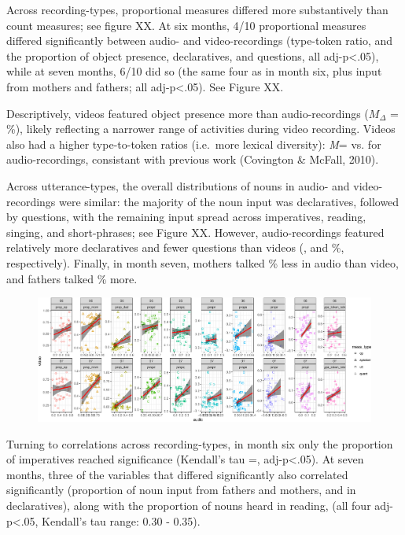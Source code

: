 \documentclass[floatsintext,man]{apa6}
\theoremstyle{definition}
\theoremstyle{definition}
\theoremstyle{definition}
\theoremstyle{remark}
\begin{document}
Across recording-types, proportional measures differed more
substantively than count measures; see figure XX. At six months, 4/10
proportional measures differed significantly between audio- and
video-recordings (type-token ratio, and the proportion of object
presence, declaratives, and questions, all adj-p\textless{}.05), while
at seven months, 6/10 did so (the same four as in month six, plus input
from mothers and fathers; all adj-p\textless{}.05). See Figure XX.

Descriptively, videos featured object presence more than
audio-recordings (\(M_{\Delta}\) = \%), likely reflecting a narrower
range of activities during video recording. Videos also had a higher
type-to-token ratios (i.e.~more lexical diversity): \emph{M}= vs. for
audio-recordings, consistant with previous work (Covington \& McFall,
2010).

Across utterance-types, the overall distributions of nouns in audio- and
video-recordings were similar: the majority of the noun input was
declaratives, followed by questions, with the remaining input spread
across imperatives, reading, singing, and short-phrases; see Figure XX.
However, audio-recordings featured relatively more declaratives and
fewer questions than videos (, and \%, respectively). Finally, in month
seven, mothers talked \% less in audio than video, and fathers talked \%
more.

\begin{figure}[htbp]
\centering
\includegraphics{sixseven_papaja_files/figure-latex/gr_derived_props_av-1.pdf}
\caption{}
\end{figure}

Turning to correlations across recording-types, in month six only the
proportion of imperatives reached significance (Kendall's tau =,
adj-p\textless{}.05). At seven months, three of the variables that
differed significantly also correlated significantly (proportion of noun
input from fathers and mothers, and in declaratives), along with the
proportion of nouns heard in reading, (all four adj-p\textless{}.05,
Kendall's tau range: 0.30 - 0.35).
\end{document}

